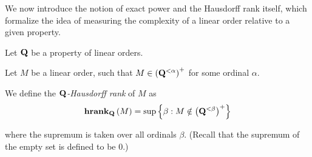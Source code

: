 We now introduce the notion of exact power and the Hausdorff rank itself, which formalize the idea of measuring the
complexity of a linear order relative to a given property.

\begin{definition}
  Let $\mathbf{Q}$ be a property of linear orders.

  Let $M$ be a linear order, such that
  $M \in \left( {\mathbf{Q}^{< \alpha}} \right)^+$ for some ordinal $\alpha$.

  We define the \emph{$\mathbf{Q}$-Hausdorff rank} of $M$ as
  \[
    \mathbf{hrank}_{\mathbf{Q}} \left( {M} \right) = \sup \left\{ {\beta : M \notin \left( {\mathbf{Q}^{< \beta}} \right)^{+}} \right\}
  \]

  where the supremum is taken over all ordinals $\beta$.
  (Recall that the supremum of the empty set is defined to be $0$.)

\end{definition}